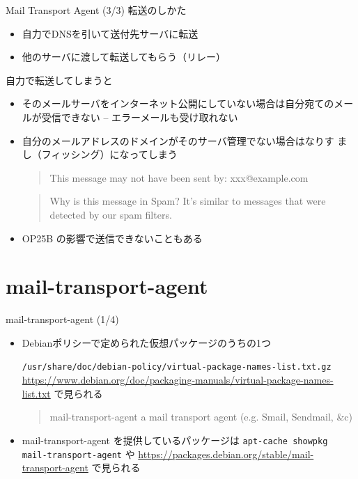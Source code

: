 \begin{frame}{Mail Transport Agent (3/3)}
転送のしかた
	\begin{itemize}
	 \item 自力でDNSを引いて送付先サーバに転送
	 \item 他のサーバに渡して転送してもらう（リレー）
	\end{itemize}

 \pause
 自力で転送してしまうと
 \pause
 \begin{itemize}
  \item そのメールサーバをインターネット公開にしていない場合は自分宛てのメー
	ルが受信できない -- エラーメールも受け取れない
  \pause
  \item 自分のメールアドレスのドメインがそのサーバ管理でない場合はなりす
	まし（フィッシング）になってしまう

	\begin{quote}
This message may not have been sent by: xxx@example.com
	\end{quote}
\begin{quote}
Why is this message in Spam? It's similar to messages that were detected by our spam filters.
\end{quote}
  \pause
  \item OP25B の影響で送信できないこともある
 \end{itemize}

\end{frame}

\section{mail-transport-agent}
\begin{frame}[containsverbatim]{mail-transport-agent (1/4)}

\begin{itemize}
 \item Debianポリシーで定められた仮想パッケージのうちの1つ

 \scriptsize
 \verb|/usr/share/doc/debian-policy/virtual-package-names-list.txt.gz|
 \footnotesize
 \url{https://www.debian.org/doc/packaging-manuals/virtual-package-names-list.txt}
 \normalsize
 で見られる

\begin{quote}
mail-transport-agent{ }{ }{ }{ }a mail transport agent (e.g. Smail, Sendmail, \&c)
\end{quote}

 \item 
 mail-transport-agent を提供しているパッケージは
 \verb|apt-cache showpkg mail-transport-agent|
 や
 \footnotesize
 \url{https://packages.debian.org/stable/mail-transport-agent}
 \normalsize
 で見られる
\end{itemize}
\end{frame}

